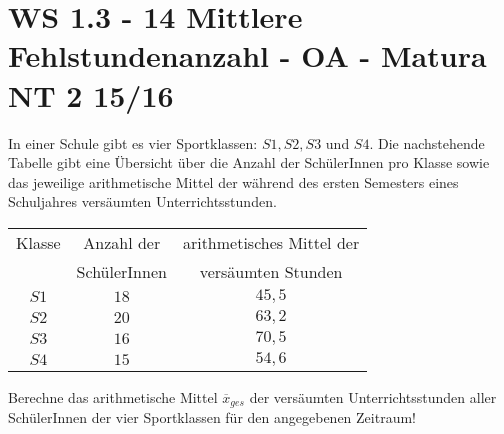 \section{WS 1.3 - 14 Mittlere Fehlstundenanzahl - OA - Matura NT 2 15/16}

\begin{beispiel}[WS 1.3]{1} %
In einer Schule gibt es vier Sportklassen: $S1,S2,S3$ und $S4$. Die nachstehende Tabelle gibt eine Übersicht über die Anzahl der SchülerInnen pro Klasse sowie das jeweilige arithmetische Mittel der während des ersten Semesters eines Schuljahres versäumten Unterrichtsstunden.

\begin{center}
	\begin{tabular}{|c|c|c|}\hline
	Klasse&Anzahl der&arithmetisches Mittel der\\
	&SchülerInnen&versäumten Stunden\\ \hline
	$S1$&$18$&$45,5$\\ \hline
	$S2$&$20$&$63,2$\\ \hline
	$S3$&$16$&$70,5$\\ \hline
	$S4$&$15$&$54,6$\\ \hline
	\end{tabular}
\end{center}

Berechne das arithmetische Mittel $\overline{x}_{ges}$ der versäumten Unterrichtsstunden aller SchülerInnen der vier Sportklassen für den angegebenen Zeitraum!\leer

\end{beispiel}